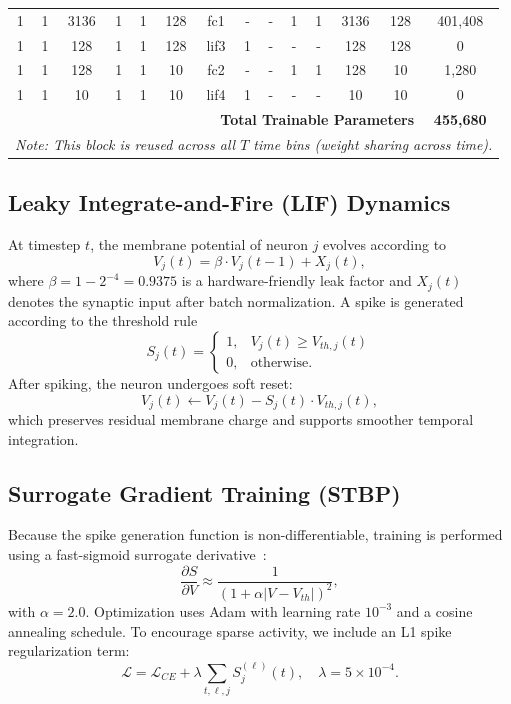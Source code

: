 \documentclass[conference]{IEEEtran}
\begin{document}
\begin{table}[t]
{\begin{tabular}{|c c c|c c c|c|c|c|c c|c|c|c|}
1  & 1  & 3136 & 1  & 1  & 128 & fc1     & - & - & 1 & 1 & 3136 & 128 & 401,408 \\
1  & 1  & 128 & 1  & 1  & 128 & lif3     & 1 & - & - & - & 128  & 128 & 0       \\
1  & 1  & 128 & 1  & 1  & 10  & fc2      & - & - & 1 & 1 & 128  & 10  & 1,280   \\
1  & 1  & 10  & 1  & 1  & 10  & lif4     & 1 & - & - & - & 10   & 10  & 0       \\
\hline
\multicolumn{13}{|r|}{\textbf{Total Trainable Parameters}} & \textbf{455,680} \\
\hline
\multicolumn{14}{|l|}{\textit{Note: This block is reused across all $T$ time bins (weight sharing across time).}} \\
\hline
\end{tabular}
}
\label{tab:lenet_struct}
\normalsize
\end{table}

\subsection{Leaky Integrate-and-Fire (LIF) Dynamics}
At timestep $t$, the membrane potential of neuron $j$ evolves according to
\begin{equation}
V_j(t) = \beta \cdot V_j(t{-}1) + X_j(t),
\label{eq:lif}
\end{equation}
where $\beta = 1 - 2^{-4} = 0.9375$ is a hardware-friendly leak factor and $X_j(t)$ denotes the synaptic input after batch normalization. A spike is generated according to the threshold rule
\begin{equation}
S_j(t) =
\begin{cases}
1, & V_j(t) \ge V_{th,j}(t) \\
0, & \text{otherwise.}
\end{cases}
\end{equation}
After spiking, the neuron undergoes soft reset:
\begin{equation}
V_j(t) \leftarrow V_j(t) - S_j(t) \cdot V_{th,j}(t),
\end{equation}
which preserves residual membrane charge and supports smoother temporal integration.

\subsection{Surrogate Gradient Training (STBP)}
Because the spike generation function is non-differentiable, training is performed using a fast-sigmoid surrogate derivative~\cite{neftci2019surrogate,zenke2021remarkable}:
\begin{equation}
\frac{\partial S}{\partial V} \approx \frac{1}{\left(1+\alpha|V-V_{th}|\right)^2},
\end{equation}
with $\alpha=2.0$. Optimization uses Adam with learning rate $10^{-3}$ and a cosine annealing schedule. To encourage sparse activity, we include an L1 spike regularization term:
\begin{equation}
\mathcal{L} = \mathcal{L}_{CE} + \lambda \sum_{t,\ell,j} S_j^{(\ell)}(t), \quad \lambda = 5 \times 10^{-4}.
\end{equation}
\end{document}
